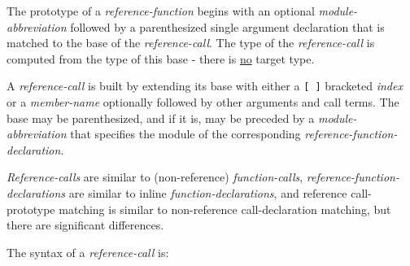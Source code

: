 \documentclass[12pt]{article}
\begin{document}
The prototype of a {\em reference-function} begins with
an optional {\em module-abbreviation} followed by
a parenthesized single argument declaration that is matched
to the base of the {\em reference-call}.  The type of
the {\em reference-call} is computed from the type of
this base - there is \underline{no} target type.

A {\em reference-call} is built by extending its base
with either a {\tt [~]} bracketed {\em index}
or a {\em member-name} optionally followed by other
arguments and call terms.  The base may be parenthesized, and
if it is, may be preceded by a {\em module-abbreviation} that
specifies the module of the corresponding {\em reference-function-declaration}.

{\em Reference-calls} are similar to (non-reference) {\em function-calls},
{\em reference-function-declarations} are similar to
inline {\em function-declarations}, and reference call-prototype
matching is similar to non-reference call-declaration matching,
but there are significant differences.

The syntax of a {\em reference-call} is:
\end{document}
